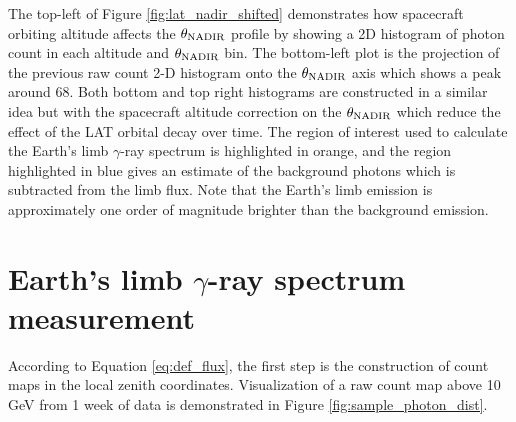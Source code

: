 The top-left of Figure \ref{fig:lat_nadir_shifted} demonstrates how 
spacecraft orbiting altitude
affects the $\theta_{\rm NADIR}$ profile by showing a 2D histogram
of photon count in each altitude and $\theta_{\rm NADIR}$ bin.
The bottom-left plot is the projection of the
previous raw count 2-D histogram
onto the $\theta_{\rm NADIR}$ axis which shows
a peak around 68\textdegree. Both bottom and top right histograms
are constructed in a similar idea but with the spacecraft altitude
correction on the $\theta_{\rm NADIR}$ which reduce the effect
of the LAT orbital decay over time. The region of interest used
to calculate the Earth's limb $\gamma$-ray spectrum is
highlighted in orange, and the region highlighted in blue
gives an estimate of the background photons which is subtracted
from the limb flux. Note that the Earth's limb emission is
approximately one order of magnitude brighter than the background
emission.



\section{Earth's limb $\gamma$-ray spectrum measurement}

According to Equation \ref{eq:def_flux}, 
the first step is the construction of
count maps in the local zenith coordinates.
Visualization of a raw count map above 10 GeV from 1 week of
data is demonstrated in Figure \ref{fig:sample_photon_dist}.

